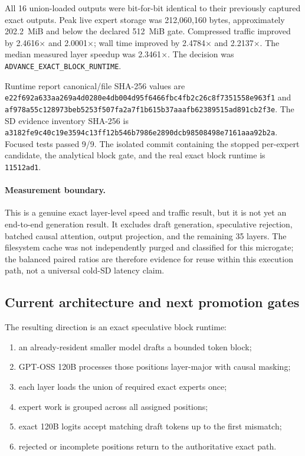 All 16 union-loaded outputs were bit-for-bit identical to their previously
captured exact outputs.  Peak live expert storage was 212,060,160 bytes,
approximately 202.2~MiB and below the declared 512~MiB gate.  Compressed
traffic improved by 2.4616$\times$ and 2.0001$\times$; wall time improved by
2.4784$\times$ and 2.2137$\times$.  The median measured layer speedup was
2.3461$\times$.  The decision was
\texttt{ADVANCE\_EXACT\_BLOCK\_RUNTIME}.

Runtime report canonical/file SHA-256 values are
\texttt{e22f692a633aa269a4d0280e4db004d95f6466fbc4fb2c26c8f7351558e963f1}
and
\texttt{af978a55c128973beb5253f507fa2a7f1b615b37aaafb62389515ad891cb2f3e}.
The SD evidence inventory SHA-256 is
\texttt{a3182fe9c40c19e3594c13ff12b546b7986e2890dcb98508498e7161aaa92b2a}.
Focused tests passed 9/9.  The isolated commit containing the stopped
per-expert candidate, the analytical block gate, and the real exact block
runtime is \texttt{11512ad1}.

\paragraph{Measurement boundary.}
This is a genuine exact layer-level speed and traffic result, but it is not yet
an end-to-end generation result.  It excludes draft generation, speculative
rejection, batched causal attention, output projection, and the remaining 35
layers.  The filesystem cache was not independently purged and classified for
this microgate; the balanced paired ratios are therefore evidence for reuse
within this execution path, not a universal cold-SD latency claim.

\subsection{Current architecture and next promotion gates}

The resulting direction is an exact speculative block runtime:
\begin{enumerate}
  \item an already-resident smaller model drafts a bounded token block;
  \item GPT-OSS 120B processes those positions layer-major with causal masking;
  \item each layer loads the union of required exact experts once;
  \item expert work is grouped across all assigned positions;
  \item exact 120B logits accept matching draft tokens up to the first mismatch;
  \item rejected or incomplete positions return to the authoritative exact path.
\end{enumerate}

